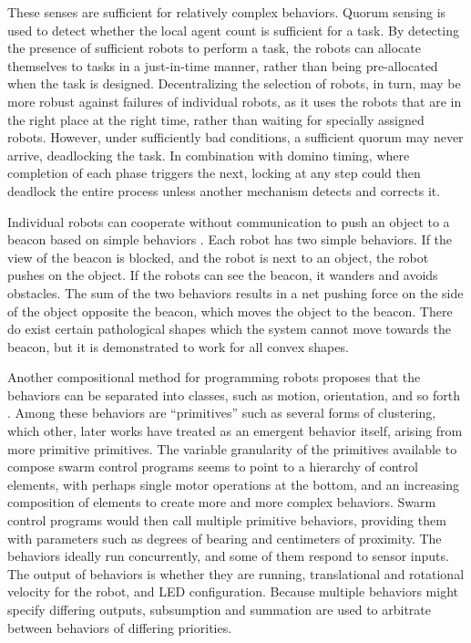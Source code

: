 \documentclass[]{article}
\begin{document}
These senses are sufficient for relatively complex behaviors. 
Quorum sensing is used to detect whether the local agent count is sufficient for a task. 
By detecting the presence of sufficient robots to perform a task, the robots can allocate themselves to tasks in a just-in-time manner, rather than being pre-allocated when the task is designed. 
Decentralizing the selection of robots, in turn, may be more robust against failures of individual robots, as it uses the robots that are in the right place at the right time, rather than waiting for specially assigned robots. 
However, under sufficiently bad conditions, a sufficient quorum may never arrive, deadlocking the task. 
In combination with domino timing, where completion of each phase triggers the next, locking at any step could then deadlock the entire process unless another mechanism detects and corrects it.

Individual robots can cooperate without communication to push an object to a beacon based on simple behaviors \cite{chen2015occlusion}. 
Each robot has two simple behaviors.
If the view of the beacon is blocked, and the robot is next to an object, the robot pushes on the object.
If the robots can see the beacon, it wanders and avoids obstacles. 
The sum of the two behaviors results in a net pushing force on the side of the object opposite the beacon, which moves the object to the beacon. 
There do exist certain pathological shapes which the system cannot move towards the beacon, but it is demonstrated to work for all convex shapes. 

Another compositional method for programming robots proposes that the behaviors can be separated into classes, such as motion, orientation, and so forth \cite{mclurkin2004stupid}. 
Among these behaviors are ``primitives'' such as several forms of clustering, which other, later works have treated as an emergent behavior itself, arising from more primitive primitives. 
The variable granularity of the primitives available to compose swarm control programs seems to point to a hierarchy of control elements, with perhaps single motor operations at the bottom, and an increasing composition of elements to create more and more complex behaviors.
Swarm control programs would then call multiple primitive behaviors, providing them with parameters such as degrees of bearing and centimeters of proximity. 
The behaviors ideally run concurrently, and some of them respond to sensor inputs. 
The output of behaviors is whether they are running, translational and rotational velocity for the robot, and LED configuration. 
Because multiple behaviors might specify differing outputs, subsumption and summation are used to arbitrate between behaviors of differing priorities. 
\end{document}
